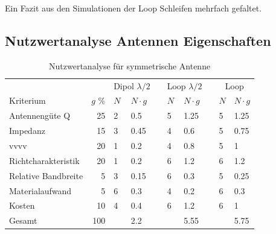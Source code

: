 Ein Fazit aus den Simulationen der Loop Schleifen mehrfach gefaltet.
\subsection{Nutzwertanalyse Antennen Eigenschaften }
\begin{table}[!ht]
  \centering
  \begin{tabular}{l r l l l l l l l l} \toprule 
  && \multicolumn{2}{c}{Dipol $\lambda/2$}   && \multicolumn{2}{c}{Loop $\lambda/2$}   && \multicolumn{2}{c}{Loop} \\ \cmidrule{3-4} \cmidrule{6-7} \cmidrule{9-10}
  Kriterium                  & $g$ \%  & $N$ & $N\cdot g$               && $N$ & $N\cdot g$                  && $N$ & $N\cdot g$ \\ \midrule
  Antennengüte Q            &  25             & 2   & 0.5               && 5   & 1.25                        && 5   & 1.25 \\
  Impedanz                  &  15             & 3   & 0.45              && 4   & 0.6                         && 5   & 0.75 \\
  vvvv    &  20             & 1   & 0.2               && 4   & 0.8                         && 5   & 1 \\
  Richtcharakteristik       &  20             & 1   & 0.2               && 6   & 1.2                         && 6   & 1.2 \\
  Relative Bandbreite       &   5             & 3   & 0.15              && 6   & 0.3                         && 5   & 0.25 \\
  Materialaufwand           &   5             & 6   & 0.3               && 4   & 0.2                         && 6   & 0.3 \\
  Kosten                    &  10             & 4   & 0.4               && 6   & 1.2                         && 6   & 1 \\
  Gesamt                    & 100             &     & 2.2               &&     & 5.55                        &&     & 5.75 \\ \bottomrule
  \end{tabular}
  \caption{Nutzwertanalyse für symmetrische Antenne}
  \label{nutzwertEvaluation}
\end{table}
\newpage 
\thispagestyle{empty}